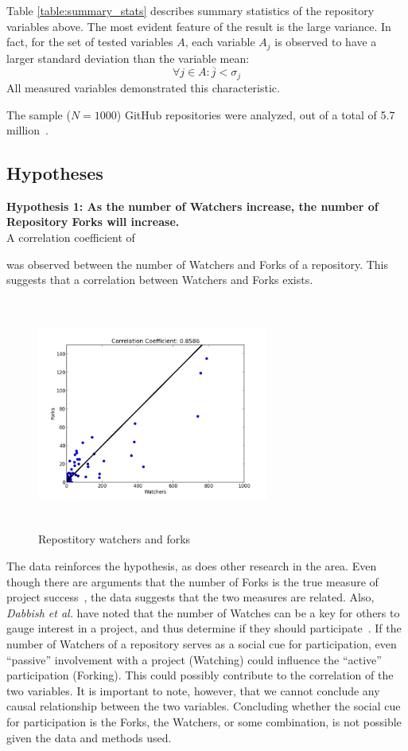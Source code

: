 \documentclass{proc}
\begin{document}
{{{{{{{Table \ref{table:summary_stats} describes summary statistics of the repository variables above. The most evident feature of the result is the large variance. In fact, for the set of tested variables $A$, each variable $A_j$ is observed to have a larger standard deviation than the variable mean:
\begin{equation}
\forall j \in A \colon \overline{j} < \sigma_{j}
\label{eq:variance}
\end{equation}
All measured variables demonstrated this characteristic.

The sample ($N = 1000$) GitHub repositories were analyzed, out of a total of 5.7 million~\cite{githubPress}.

\subsection{Hypotheses}
\noindent \textbf{Hypothesis 1: As the number of Watchers increase, the number of Repository Forks will increase.}\\
A correlation coefficient of } was observed between the number of Watchers and Forks of a repository. This suggests that a correlation between Watchers and Forks exists.

\begin{figure}
\includegraphics[height=3in,width=3in]{images/watcher_forks_scatterplot.png}
\caption{Repostitory watchers and forks}
\end{figure}

The data reinforces the hypothesis, as does other research in the area. Even though there are arguments that the number of Forks is the true measure of project success~\cite{baudry2012towards}, the data suggests that the two measures are related. Also, \textit{Dabbish et al.} have noted that the number of Watches can be a key for others to gauge interest in a project, and thus determine if they should participate~\cite{dabbish2013leveraging}. If the number of Watchers of a repository serves as a social cue for participation, even ``passive'' involvement with a project (Watching) could influence the ``active'' participation (Forking). This could possibly contribute to the correlation of the two variables. It is important to note, however, that we cannot conclude any causal relationship between the two variables. Concluding whether the social cue for participation is the Forks, the Watchers, or some combination, is not possible given the data and methods used.\\

}}}}}}
\end{document}
